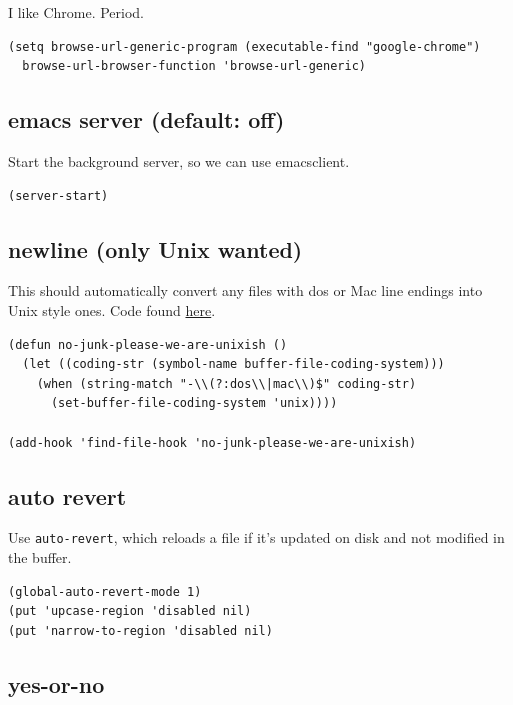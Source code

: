 \documentclass[11pt]{article}
\begin{document}
I like Chrome. Period.

\begin{verbatim}
(setq browse-url-generic-program (executable-find "google-chrome")
  browse-url-browser-function 'browse-url-generic)
\end{verbatim}

\subsection{emacs server (default: off)}
\label{sec:org44eb461}

Start the background server, so we can use emacsclient.

\begin{verbatim}
(server-start)
\end{verbatim}

\subsection{newline (only Unix wanted)}
\label{sec:org519f433}

This should automatically convert any files with dos or Mac line
endings into Unix style ones. Code found \href{https://www.emacswiki.org/emacs/EndOfLineTips}{here}.

\begin{verbatim}
(defun no-junk-please-we-are-unixish ()
  (let ((coding-str (symbol-name buffer-file-coding-system)))
    (when (string-match "-\\(?:dos\\|mac\\)$" coding-str)
      (set-buffer-file-coding-system 'unix))))

(add-hook 'find-file-hook 'no-junk-please-we-are-unixish)
\end{verbatim}

\subsection{auto revert}
\label{sec:org74258a0}

Use \texttt{auto-revert}, which reloads a file if it's updated on disk and not
modified in the buffer.

\begin{verbatim}
(global-auto-revert-mode 1)
(put 'upcase-region 'disabled nil)
(put 'narrow-to-region 'disabled nil)
\end{verbatim}

\subsection{yes-or-no}
\label{sec:org9ec6b61}
\end{document}
